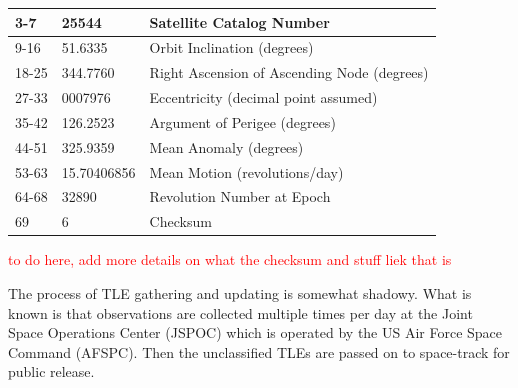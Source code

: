 \documentclass[12pt]{report}
\begin{document}
\begin{table}[h!]
{\begin{tabular}{|l|l|l|}
				3-7                                     & 25544                                   & Satellite Catalog Number                                                        \\ \hline
				9-16                                    & 51.6335                                 & Orbit Inclination (degrees)                                                     \\ \hline
				18-25                                   & 344.7760                                & Right Ascension of Ascending Node (degrees)                                     \\ \hline
				27-33                                   & 0007976                                 & Eccentricity (decimal point assumed)                                            \\ \hline
				35-42                                   & 126.2523                                & Argument of Perigee (degrees)                                                   \\ \hline
				44-51                                   & 325.9359                                & Mean Anomaly (degrees)                                                          \\ \hline
				53-63                                   & 15.70406856                             & Mean Motion (revolutions/day)                                                   \\ \hline
				64-68                                   & 32890                                   & Revolution Number at Epoch                                                      \\ \hline
				69                                      & 6                                       & Checksum                                                                        \\ \hline
			\end{tabular}%
		}
	\end{table}
	
	

	\textcolor{red}{to do here, add more details on what the checksum and stuff liek that is}
	
	\par 
	The process of TLE gathering and updating is somewhat shadowy. \cite{vallado2012two} What is known is that observations are collected multiple times per day at the Joint
	Space Operations Center (JSPOC) which is operated by the US Air Force Space Command (AFSPC). Then the unclassified TLEs are passed on to space-track for public release.  
	
\end{document}
